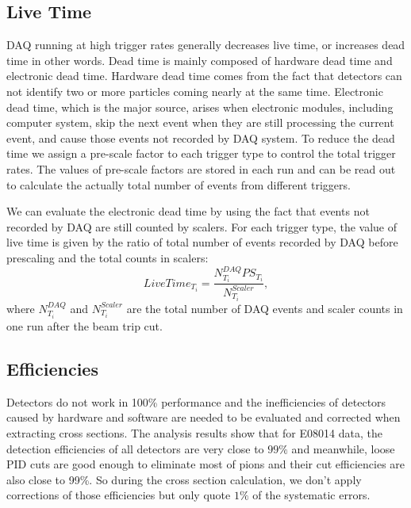 \documentclass[a4paper,10.5pt]{report}
\begin{document}
\subsection{Live Time}

DAQ running at high trigger rates generally decreases live time, or increases dead time in other words. Dead time is mainly composed of hardware dead time and electronic dead time. Hardware dead time comes from the fact that detectors can not identify two or more particles coming nearly at the same time. Electronic dead time, which is the major source, arises when electronic modules, including computer system, skip the next event when they are still processing the current event, and cause those events not recorded by DAQ system. To reduce the dead time we assign a pre-scale factor to each trigger type to control the total trigger rates. The values of pre-scale factors are stored in each run and can be read out to calculate the actually total number of events from different triggers.

We can evaluate the electronic dead time by using the fact that events not recorded by DAQ are still counted by scalers. For each trigger type, the value of live time is given by the ratio of total number of events recorded by DAQ before prescaling and the total counts in scalers:
\begin{equation}
  LiveTime_{T_{i}} = \frac{N_{T_{i}}^{DAQ} PS_{T_{i}}}{N_{T_{i}}^{Scaler}},
  \label{eq_lt}
\end{equation}
where $N_{T_{i}}^{DAQ}$ and $N_{T_{i}}^{Scaler}$ are the total number of DAQ events and scaler counts in one run after the beam trip cut.

\subsection{Efficiencies}

Detectors do not work in 100\% performance and the inefficiencies of detectors caused by hardware and software are needed to be evaluated and corrected when extracting cross sections. The analysis results show that for E08014 data, the detection efficiencies of all detectors are very close to $99\%$ and meanwhile, loose PID cuts are good enough to eliminate most of pions and their cut efficiencies are also close to 99\%. So during the cross section calculation, we don't apply corrections of those efficiencies but only quote $1\%$ of the systematic errors.
\end{document}
